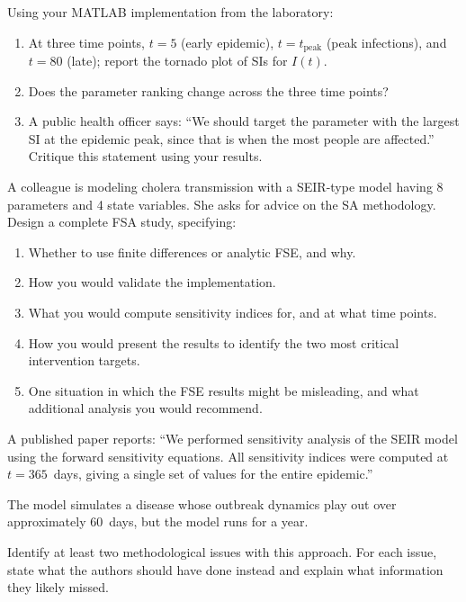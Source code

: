 \begin{exercise}[\bloom{L4}]
\label{ex:ch4:sirtime}
Using your MATLAB implementation from the laboratory:
\begin{enumerate}[label=(\alph*)]
  \item At three time points, $t = 5$ (early epidemic),
        $t = t_{\text{peak}}$ (peak infections), and $t = 80$ (late);
        report the tornado plot of SIs for $I(t)$.
  \item Does the parameter ranking change across the three time points?
  \item A public health officer says: ``We should target the parameter
        with the largest SI at the epidemic peak, since that is when the
        most people are affected.'' Critique this statement using your results.
\end{enumerate}
\end{exercise}

\begin{exercise}[\bloom{L5}]
\label{ex:ch4:design}
A colleague is modeling cholera transmission with a SEIR-type model
having 8 parameters and 4 state variables.
She asks for advice on the SA methodology.
Design a complete FSA study, specifying:
\begin{enumerate}[label=(\alph*)]
  \item Whether to use finite differences or analytic FSE, and why.
  \item How you would validate the implementation.
  \item What \QOIs you would compute sensitivity indices for,
        and at what time points.
  \item How you would present the results to identify the
        two most critical intervention targets.
  \item One situation in which the FSE results might be misleading,
        and what additional analysis you would recommend.
\end{enumerate}
\end{exercise}

\begin{exercise}[\bloom{L6}]
\label{ex:ch4:critique}
A published paper reports: ``We performed sensitivity analysis of the
SEIR model using the forward sensitivity equations. All sensitivity
indices were computed at $t = 365$~days, giving a single set of
values for the entire epidemic.''

The model simulates a disease whose outbreak dynamics play out
over approximately 60~days, but the model runs for a year.

Identify at least two methodological issues with this approach.
For each issue, state what the authors should have done instead
and explain what information they likely missed.
\end{exercise}


